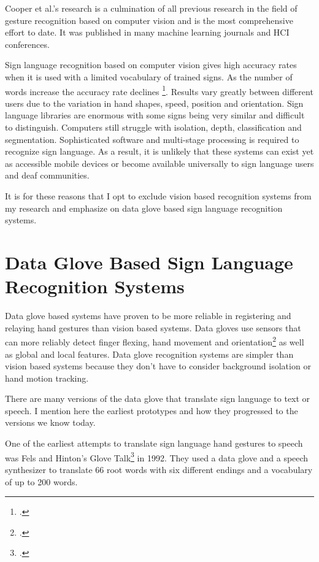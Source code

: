 Cooper et al.’s research is a culmination of all previous research in the field of gesture recognition based on computer vision and is the most comprehensive effort to date. It was published in many machine learning journals and HCI conferences. 

Sign language recognition based on computer vision gives high accuracy rates when it is used with a limited vocabulary of trained signs. As the number of words increase the accuracy rate declines \footcite{Fang2003}. Results vary greatly between different users due to the variation in hand shapes, speed, position and orientation. Sign language libraries are enormous with some signs being very similar and difficult to distinguish. Computers still struggle with isolation, depth, classification and segmentation. Sophisticated software and multi-stage processing is required to recognize sign language. As a result, it is unlikely that these systems can exist yet as accessible mobile devices or become available universally to sign language users and deaf communities. 

It is for these reasons that I opt to exclude vision based recognition systems from my research and emphasize on data glove based sign language recognition systems. 


\section{Data Glove Based Sign Language Recognition Systems} 

Data glove based systems have proven to be more reliable in registering and relaying hand gestures than vision based systems. Data gloves use sensors that can more reliably detect finger flexing, hand movement and orientation\footcite{AnethaK2014} as well as global and local features. Data glove recognition systems are simpler than vision based systems because they don’t have to consider background isolation or hand motion tracking. 

There are many versions of the data glove that translate sign language to text or speech. I mention here the earliest prototypes and how they progressed to the versions we know today. 

One of the earliest attempts to translate sign language hand gestures to speech was Fels and Hinton’s Glove Talk\footcite{Fels1993} in 1992. They used a data glove and a speech synthesizer to translate 66 root words with six different endings and a vocabulary of up to 200 words. 


